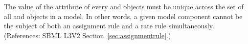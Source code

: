 The value of the attribute  of every \AssignmentRule and
\RateRule objects must be unique across the set of all \AssignmentRule and
\RateRule objects in a model.  In other words, a given model component
cannot be the subject of both an assignment rule and a rate rule
simultaneously.  (References: SBML L3V2 Section~\ref{sec:assignmentrule}.)
